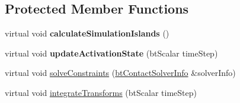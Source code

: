 \subsection*{Protected Member Functions}
\begin{DoxyCompactItemize}
\item 
\hypertarget{classbt_multi_body_dynamics_world_a65bee9648fc52d04658334539b1df759}{virtual void {\bfseries calculate\+Simulation\+Islands} ()}\label{classbt_multi_body_dynamics_world_a65bee9648fc52d04658334539b1df759}

\item 
\hypertarget{classbt_multi_body_dynamics_world_a14f75ed5c93f4b90b442ef5b54f52c1d}{virtual void {\bfseries update\+Activation\+State} (bt\+Scalar time\+Step)}\label{classbt_multi_body_dynamics_world_a14f75ed5c93f4b90b442ef5b54f52c1d}

\item 
virtual void \hyperlink{classbt_multi_body_dynamics_world_a96ca0256c11525090a831cc854fe0750}{solve\+Constraints} (\hyperlink{structbt_contact_solver_info}{bt\+Contact\+Solver\+Info} \&solver\+Info)
\item 
virtual void \hyperlink{classbt_multi_body_dynamics_world_a6abe9896c6178b8d5bebdbca53fa7a74}{integrate\+Transforms} (bt\+Scalar time\+Step)
\end{DoxyCompactItemize}
